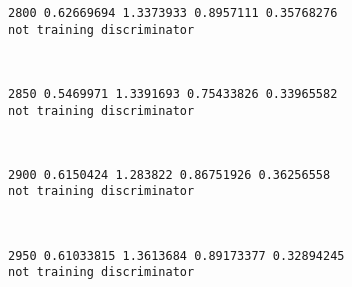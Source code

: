 \documentclass[11pt]{article}
\begin{document}
    \begin{Verbatim}[commandchars=\\\{\}]
2800 0.62669694 1.3373933 0.8957111 0.35768276
not training discriminator

    \end{Verbatim}

    \begin{center}
    \end{center}
    { \hspace*{\fill} \\}
    
    \begin{Verbatim}[commandchars=\\\{\}]
2850 0.5469971 1.3391693 0.75433826 0.33965582
not training discriminator

    \end{Verbatim}

    \begin{center}
    \end{center}
    { \hspace*{\fill} \\}
    
    \begin{Verbatim}[commandchars=\\\{\}]
2900 0.6150424 1.283822 0.86751926 0.36256558
not training discriminator

    \end{Verbatim}

    \begin{center}
    \end{center}
    { \hspace*{\fill} \\}
    
    \begin{Verbatim}[commandchars=\\\{\}]
2950 0.61033815 1.3613684 0.89173377 0.32894245
not training discriminator

    \end{Verbatim}

    \begin{center}
    \end{center}
    { \hspace*{\fill} \\}
    
\end{document}
